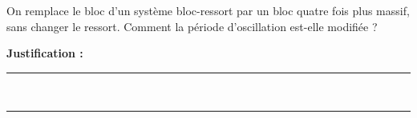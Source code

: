 On remplace le bloc d'un système bloc-ressort par un bloc quatre fois plus massif, sans changer le ressort. Comment la période d'oscillation est-elle modifiée ?

\choices

\noindent\textbf{Justification :} \hrulefill \\[2.5ex]
\rule{\linewidth}{0.4pt} \\[2.5ex]
\rule{\linewidth}{0.4pt}
\vfill
